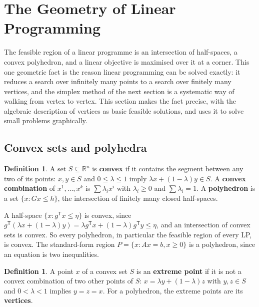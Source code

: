 \documentclass[11pt,a4paper]{article}
\numberwithin{equation}{section}
\theoremstyle{definition}
\newtheorem{defn}[thm]{Definition}
\begin{document}
\section{The Geometry of Linear Programming}
\label{sec:geometry}

The feasible region of a linear programme is an intersection of half-spaces, a convex polyhedron, and a linear objective is maximised over it at a corner. This one geometric fact is the reason linear programming can be solved exactly: it reduces a search over infinitely many points to a search over finitely many
vertices, and the simplex method of the next section is a systematic way of walking from vertex to vertex. This section makes the fact precise, with the algebraic description of vertices as basic feasible solutions, and uses it to solve small problems graphically.

\subsection{Convex sets and polyhedra}
\label{ssec:convex}

\begin{defn}
A set $S \subseteq \mathbb R^n$ is \textbf{convex} if it contains the segment between any two of its points: $x, y \in S$ and $0 \leq \lambda \leq 1$ imply $\lambda x + (1 - \lambda)y \in S$. A \textbf{convex combination} of $x^1, \ldots, x^k$ is $\sum\lambda_ix^i$ with $\lambda_i \geq 0$ and $\sum\lambda_i = 1$. A
\textbf{polyhedron} is a set $\{x : Gx \leq h\}$, the intersection of finitely many closed half-spaces.
\end{defn}

A half-space $\{x : g^{\mathsf T}x \leq \eta\}$ is convex, since $g^{\mathsf T}(\lambda x + (1 - \lambda)y) = \lambda g^{\mathsf T}x + (1 - \lambda)g^{\mathsf T}y \leq \eta$, and an intersection of convex sets is convex. So every polyhedron, in particular the feasible region of every LP, is convex. The standard-form region
$P = \{x : Ax = b, x \geq 0\}$ is a polyhedron, since an equation is two inequalities.

\begin{defn}
A point $x$ of a convex set $S$ is an \textbf{extreme point} if it is not a convex combination of two other points of $S$: $x = \lambda y + (1 - \lambda)z$ with $y, z \in S$ and $0 < \lambda < 1$ implies $y = z = x$. For a polyhedron, the extreme points are its \textbf{vertices}.
\end{defn}
\end{document}
